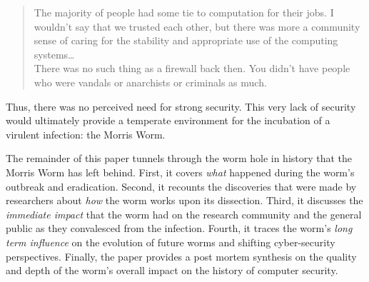 \begin{quote}
The majority of people had some tie to computation for their jobs. I wouldn't
say that we trusted each other, but there was more a community sense of caring
for the stability and appropriate use of the computing systems\ldots \\
There was no such thing as a firewall back then. You didn't have people who were
vandals or anarchists or criminals as much. 
\end{quote}

Thus, there was no perceived need for strong security. This very lack of
security would ultimately provide a temperate environment for the incubation of
a virulent infection: the Morris Worm.

The remainder of this
paper tunnels through the worm hole in history that the Morris Worm
has left behind. First, it covers \textit{what} happened during the worm's
outbreak and eradication. Second, it recounts the discoveries that were made
by researchers about \textit{how} the worm works upon its dissection. Third,
it discusses the \textit{immediate impact} that the worm had on the research
community and the general public as they convalesced from the infection. Fourth,
it traces the worm's \textit{long term influence} on the evolution of future
worms and shifting cyber-security perspectives. Finally, the paper
provides a post mortem synthesis on the quality and depth of the worm's overall
impact on the history of computer security. 
